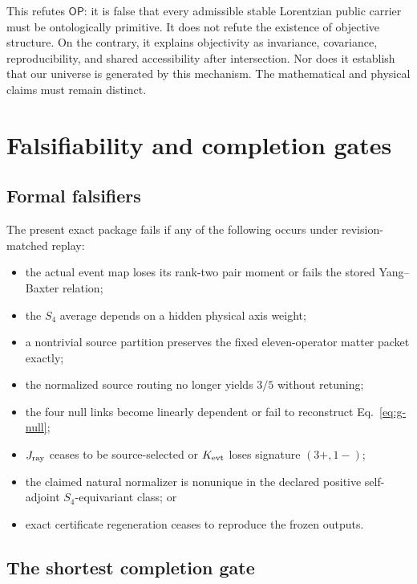 \documentclass[11pt]{article}
\theoremstyle{definition}
\theoremstyle{remark}
\newcommand{\OPT}{\mathsf{OP}}
\begin{document}
This refutes $\OPT$: it is false that every admissible stable Lorentzian public carrier must be ontologically primitive. It does not refute the existence of objective structure. On the contrary, it explains objectivity as invariance, covariance, reproducibility, and shared accessibility after intersection. Nor does it establish that our universe is generated by this mechanism. The mathematical and physical claims must remain distinct.

\section{Falsifiability and completion gates}

\subsection{Formal falsifiers}

The present exact package fails if any of the following occurs under revision-matched replay:
\begin{itemize}
\item the actual event map loses its rank-two pair moment or fails the stored Yang--Baxter relation;
\item the $S_4$ average depends on a hidden physical axis weight;
\item a nontrivial source partition preserves the fixed eleven-operator matter packet exactly;
\item the normalized source routing no longer yields $3/5$ without retuning;
\item the four null links become linearly dependent or fail to reconstruct Eq.~\eqref{eq:g-null};
\item $J_{\rm ray}$ ceases to be source-selected or $K_{\rm evt}$ loses signature $(3+,1-)$;
\item the claimed natural normalizer is nonunique in the declared positive self-adjoint $S_4$-equivariant class; or
\item exact certificate regeneration ceases to reproduce the frozen outputs.
\end{itemize}

\subsection{The shortest completion gate}
\end{document}

